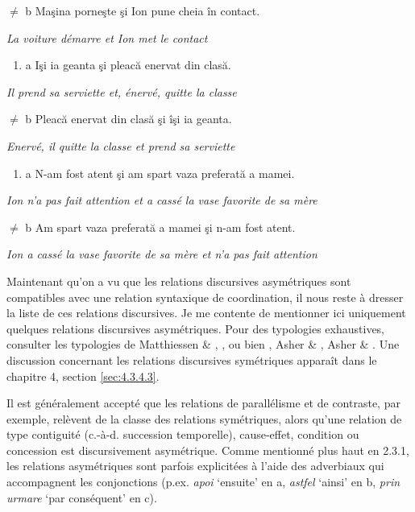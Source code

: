 ${\neq}$  b  Maşina porneşte şi Ion pune cheia în contact.

{\itshape
La voiture démarre et Ion met le contact} 


\begin{enumerate}
\item \label{bkm:Ref300786848}a  Işi ia geanta şi pleacă enervat din clasă.


\end{enumerate}
{\itshape
Il prend sa serviette et, énervé, quitte la classe } 

${\neq}$  b  Pleacă enervat din clasă şi îşi ia geanta.  

{\itshape
Enervé, il quitte la classe et prend sa serviette}


\begin{enumerate}
\item \label{bkm:Ref300786858}a  N-am fost atent şi am spart vaza preferată a mamei.


\end{enumerate}
{\itshape
Ion n'a pas fait attention et a cassé la vase favorite de sa mère}

${\neq}$  b  Am spart vaza preferată a mamei şi n-am fost atent.

{\itshape
Ion a cassé la vase favorite de sa mère et n'a pas fait attention}

Maintenant qu'on a vu que les relations discursives asymétriques sont compatibles avec une relation syntaxique de coordination, il nous reste à dresser la liste de ces relations discursives. Je me contente de mentionner ici uniquement quelques relations discursives asymétriques. Pour des typologies exhaustives, consulter les typologies de Matthiessen \& \citet{Thompson1988}, \citet{Kehler2002}, ou bien \citet{Asher1993}, Asher \& \citet{Lascarides2003}, Asher \& \citet{Vieu2005}. Une discussion concernant les relations discursives symétriques apparaît dans le chapitre 4, section \ref{sec:4.3.4.3}. 

Il est généralement accepté que les relations de parallélisme et de contraste, par exemple, relèvent de la classe des relations symétriques, alors qu'une relation de type contiguité (c.-à-d. succession temporelle), cause-effet, condition ou concession est discursivement asymétrique. Comme mentionné plus haut en 2.3.1, les relations asymétriques sont parfois explicitées à l'aide des adverbiaux qui accompagnent les conjonctions (p.ex. \textit{apoi} `ensuite' en a, \textit{astfel} `ainsi' en b, \textit{prin urmare} `par conséquent' en c).  


